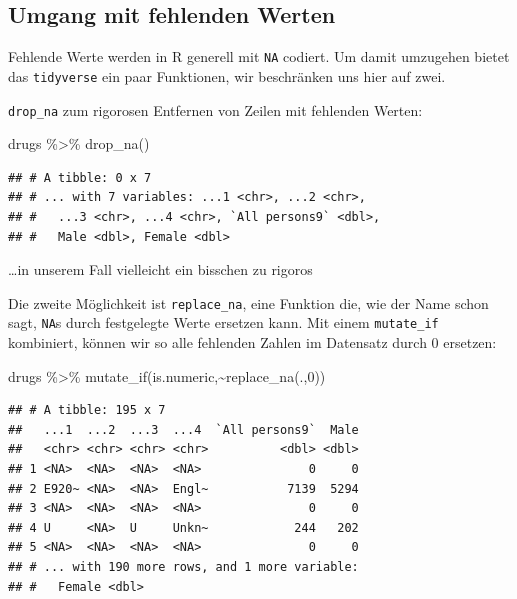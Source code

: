 \documentclass[
]{book}
\newenvironment{Shaded}{\begin{snugshade}}{\end{snugshade}}
\newcommand{\DecValTok}[1]{\textcolor[rgb]{0.00,0.00,0.81}{#1}}
\newcommand{\FunctionTok}[1]{\textcolor[rgb]{0.00,0.00,0.00}{#1}}
\newcommand{\NormalTok}[1]{#1}
\newcommand{\SpecialCharTok}[1]{\textcolor[rgb]{0.00,0.00,0.00}{#1}}
\begin{document}
\hypertarget{umgang-mit-fehlenden-werten}{%
\subsection{Umgang mit fehlenden Werten}\label{umgang-mit-fehlenden-werten}}

Fehlende Werte werden in R generell mit \texttt{NA} codiert. Um damit umzugehen bietet das \texttt{tidyverse} ein paar Funktionen, wir beschränken uns hier auf zwei.

\texttt{drop\_na} zum rigorosen Entfernen von Zeilen mit fehlenden Werten:

\begin{Shaded}
\begin{Highlighting}[]
\NormalTok{drugs }\SpecialCharTok{\%\textgreater{}\%} 
  \FunctionTok{drop\_na}\NormalTok{()}
\end{Highlighting}
\end{Shaded}

\begin{verbatim}
## # A tibble: 0 x 7
## # ... with 7 variables: ...1 <chr>, ...2 <chr>,
## #   ...3 <chr>, ...4 <chr>, `All persons9` <dbl>,
## #   Male <dbl>, Female <dbl>
\end{verbatim}

\ldots in unserem Fall vielleicht ein bisschen zu rigoros

Die zweite Möglichkeit ist \texttt{replace\_na}, eine Funktion die, wie der Name schon sagt, \texttt{NA}s durch festgelegte Werte ersetzen kann. Mit einem \texttt{mutate\_if} kombiniert, können wir so alle fehlenden Zahlen im Datensatz durch 0 ersetzen:

\begin{Shaded}
\begin{Highlighting}[]
\NormalTok{drugs }\SpecialCharTok{\%\textgreater{}\%} 
  \FunctionTok{mutate\_if}\NormalTok{(is.numeric,}\SpecialCharTok{\textasciitilde{}}\FunctionTok{replace\_na}\NormalTok{(.,}\DecValTok{0}\NormalTok{))}
\end{Highlighting}
\end{Shaded}

\begin{verbatim}
## # A tibble: 195 x 7
##   ...1  ...2  ...3  ...4  `All persons9`  Male
##   <chr> <chr> <chr> <chr>          <dbl> <dbl>
## 1 <NA>  <NA>  <NA>  <NA>               0     0
## 2 E920~ <NA>  <NA>  Engl~           7139  5294
## 3 <NA>  <NA>  <NA>  <NA>               0     0
## 4 U     <NA>  U     Unkn~            244   202
## 5 <NA>  <NA>  <NA>  <NA>               0     0
## # ... with 190 more rows, and 1 more variable:
## #   Female <dbl>
\end{verbatim}
\end{document}
